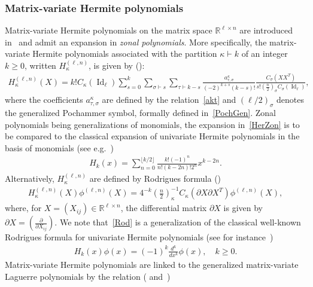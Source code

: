 \documentclass[AHL,Unicode,longabstracts,published]{cedram}
\DeclareMathOperator{\Id}{Id}
\newcommand{\R}{\mathbb{R}}
\begin{document}
\subsubsection{Matrix-variate Hermite polynomials}
Matrix-variate Hermite polynomials on the matrix space $\R^{\ell \times n}$ are introduced in~\cite{Ch92} and admit an expansion in \emph{zonal polynomials}. More specifically, the matrix-variate Hermite polynomials associated with the partition $\kappa \vdash k$ of an integer $k\geq 0$, written $H_{\kappa}^{(\ell,n)}$, is given by (\cite[Eq.~(4.11)]{Ch92}):
\begin{gather}\label{HerZon}
H^{(\ell,n)}_{\kappa}(X) = k!C_{\kappa}(\Id_{\ell}) \sum_{s=0}^k
\sum_{\sigma\vdash s}
\sum_{\tau\vdash k-s}
\frac{a^{\kappa}_{\tau,\sigma}}{(-2)^{k+s}(k-s)!}
\frac{C_{\sigma}\left(XX^T\right)}{s!\left(\frac{n}{2}\right)_{\sigma}C_{\sigma}(\Id_{\ell})},
\end{gather}
where the coefficients $a^{\kappa}_{\tau,\sigma}$ are defined by the relation~\eqref{akt} and $(\ell/2)_{\sigma}$ denotes the generalized Pochammer symbol, formally defined in~\eqref{PochGen}. Zonal polynomials being generalizations of monomials, the expansion in~\eqref{HerZon} is to be compared to the classical expansion of univariate Hermite polynomials in the basis of monomials (see e.g.~\cite[p.~19]{NP12})
\begin{gather*}
H_k(x) = \sum_{n=0}^{\lfloor k/2 \rfloor} \frac{k!(-1)^n}{n!(k-2n)!2^n}x^{k-2n}.
\end{gather*}
Alternatively, $H^{(\ell,n)}_{\kappa}$ are defined by Rodrigues formula (\cite[Eq.~(4.9)]{Ch92})
\begin{gather}\label{Rod}
H^{(\ell,n)}_{\kappa}(X)\phi^{(\ell,n)}(X) = 4^{-k}\left(\frac{n}{2}\right)_{\kappa}^{-1} C_{\kappa}\left(\partial X\partial X^T\right) \phi^{(\ell,n)}(X),
\end{gather}
where, for $X = (X_{ij})\in \R^{\ell \times n}$, the differential matrix $\partial X$ is given by $\partial X = (\frac{\partial}{\partial{X_{ij}}})$. We note that~\eqref{Rod} is a generalization of the classical well-known Rodrigues formula for univariate Hermite polynomials (see for instance~\cite[Proposition~1.4.2]{NP12})
\begin{gather}\label{UniRod}
H_k(x) \phi(x) = (-1)^k \frac{d^k}{dx^k}\phi(x), \quad k \geq 0.
\end{gather}
Matrix-variate Hermite polynomials are linked to the generalized matrix-variate Laguerre polynomials by the relation (\cite[Eq.~(5.16)]{Ch92} and~\cite[Eq.~(10)]{Hay})
\end{document}
